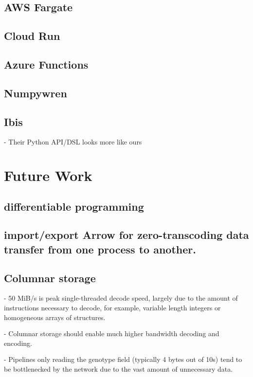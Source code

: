 \documentclass[sigconf, nonacm]{acmart}
\begin{document}
\subsection{AWS Fargate}

\subsection{Cloud Run}

\subsection{Azure Functions}

\subsection{Numpywren}

\subsection{Ibis}

    - Their Python API/DSL looks more like ours

\section{Future Work}

\subsection{differentiable programming}

\subsection{import/export Arrow for zero-transcoding data transfer from one process to another.}

\subsection{Columnar storage}

    - 50 MiB/s is peak single-threaded decode speed, largely due to the amount of instructions necessary to decode, for example, variable length integers or homogeneous arrays of structures.

    - Columnar storage should enable much higher bandwidth decoding and encoding.

    - Pipelines only reading the genotype field (typically 4 bytes out of 10s) tend to be bottlenecked by the network due to the vast amount of unnecessary data.
\end{document}
